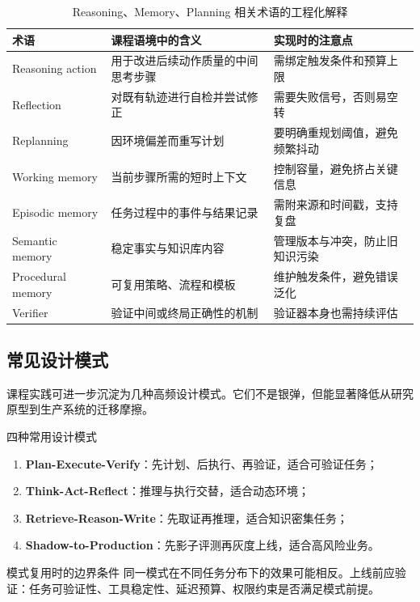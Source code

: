 \documentclass[a4paper]{article}
\begin{document}
\begin{table}[H]
\centering
\begin{tabular}{p{2.8cm}p{3.6cm}p{4.1cm}}
\toprule
\textbf{术语} & \textbf{课程语境中的含义} & \textbf{实现时的注意点} \\
\midrule
Reasoning action & 用于改进后续动作质量的中间思考步骤 & 需绑定触发条件和预算上限 \\
Reflection & 对既有轨迹进行自检并尝试修正 & 需要失败信号，否则易空转 \\
Replanning & 因环境偏差而重写计划 & 要明确重规划阈值，避免频繁抖动 \\
Working memory & 当前步骤所需的短时上下文 & 控制容量，避免挤占关键信息 \\
Episodic memory & 任务过程中的事件与结果记录 & 需附来源和时间戳，支持复盘 \\
Semantic memory & 稳定事实与知识库内容 & 管理版本与冲突，防止旧知识污染 \\
Procedural memory & 可复用策略、流程和模板 & 维护触发条件，避免错误泛化 \\
Verifier & 验证中间或终局正确性的机制 & 验证器本身也需持续评估 \\
\bottomrule
\end{tabular}
\caption{Reasoning、Memory、Planning 相关术语的工程化解释}
\end{table}

\subsection{常见设计模式}
课程实践可进一步沉淀为几种高频设计模式。它们不是银弹，但能显著降低从研究原型到生产系统的迁移摩擦。

\begin{knowledgebox}{四种常用设计模式}
\begin{enumerate}
    \item \textbf{Plan-Execute-Verify}：先计划、后执行、再验证，适合可验证任务；
    \item \textbf{Think-Act-Reflect}：推理与执行交替，适合动态环境；
    \item \textbf{Retrieve-Reason-Write}：先取证再推理，适合知识密集任务；
    \item \textbf{Shadow-to-Production}：先影子评测再灰度上线，适合高风险业务。
\end{enumerate}
\end{knowledgebox}

\begin{warningbox}{模式复用时的边界条件}
同一模式在不同任务分布下的效果可能相反。上线前应验证：任务可验证性、工具稳定性、延迟预算、权限约束是否满足模式前提。
\end{warningbox}
\end{document}

